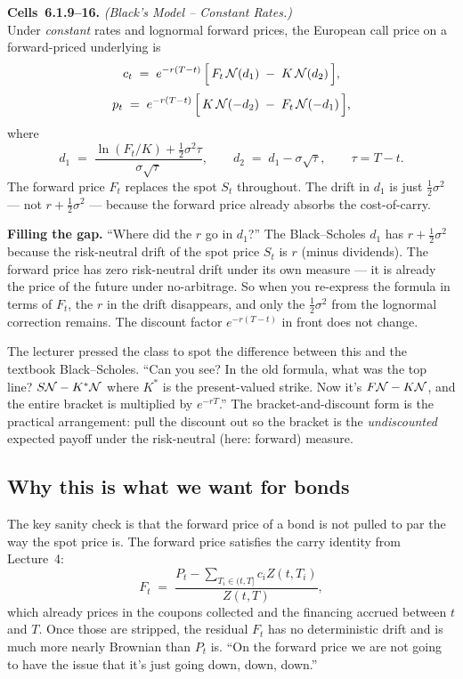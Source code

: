 \begin{keyblock}
\textbf{Cells~6.1.9--16.} \emph{(Black's Model -- Constant Rates.)}\\
Under \emph{constant} rates and lognormal forward prices, the European
call price on a forward-priced underlying is
\[
  c_t \;=\; e^{-r(T-t)}\,\Bigl[\, F_t\,\mathcal{N}(d_1) \;-\; K\,\mathcal{N}(d_2)\,\Bigr],
\]
\[
  p_t \;=\; e^{-r(T-t)}\,\Bigl[\, K\,\mathcal{N}(-d_2) \;-\; F_t\,\mathcal{N}(-d_1)\,\Bigr],
\]
where
\[
  d_1 \;=\; \frac{\ln(F_t/K) + \tfrac{1}{2}\sigma^2\tau}{\sigma\sqrt{\tau}},
  \qquad d_2 \;=\; d_1 - \sigma\sqrt{\tau},
  \qquad \tau = T - t.
\]
The forward price $F_t$ replaces the spot $S_t$ throughout. The drift
in $d_1$ is just $\tfrac{1}{2}\sigma^2$ --- not $r + \tfrac{1}{2}\sigma^2$
--- because the forward price already absorbs the cost-of-carry.
\end{keyblock}

\begin{tipblock}
\textbf{Filling the gap.} ``Where did the $r$ go in $d_1$?'' The
Black--Scholes $d_1$ has $r + \tfrac{1}{2}\sigma^2$ because the
risk-neutral drift of the spot price $S_t$ is $r$ (minus dividends).
The forward price has zero risk-neutral drift under its own measure
--- it is already the price of the future under no-arbitrage. So when
you re-express the formula in terms of $F_t$, the $r$ in the drift
disappears, and only the $\tfrac{1}{2}\sigma^2$ from the lognormal
correction remains. The discount factor $e^{-r(T-t)}$ in front does
not change.
\end{tipblock}

The lecturer pressed the class to spot the difference between this and
the textbook Black--Scholes. ``Can you see? In the old formula, what
was the top line? $S\mathcal{N} - K^{*}\mathcal{N}$ where $K^{*}$ is the present-valued
strike. Now it's $F\mathcal{N} - K\mathcal{N}$, and the entire bracket is multiplied by
$e^{-rT}$.'' The bracket-and-discount form is the practical
arrangement: pull the discount out so the bracket is the
\emph{undiscounted} expected payoff under the risk-neutral (here:
forward) measure.

\subsection{Why this is what we want for bonds}\label{L5-sec:black-bond-intuition}

The key sanity check is that the forward price of a bond is not pulled
to par the way the spot price is. The forward price satisfies the
carry identity from Lecture~4:
\[
  F_t \;=\; \frac{P_t - \sum_{T_i \in (t,T]} c_i Z(t,T_i)}{Z(t,T)},
\]
which already prices in the coupons collected and the financing accrued
between $t$ and $T$. Once those are stripped, the residual $F_t$ has no
deterministic drift and is much more nearly Brownian than $P_t$ is.
``On the forward price we are not going to have the issue that it's
just going down, down, down.''

